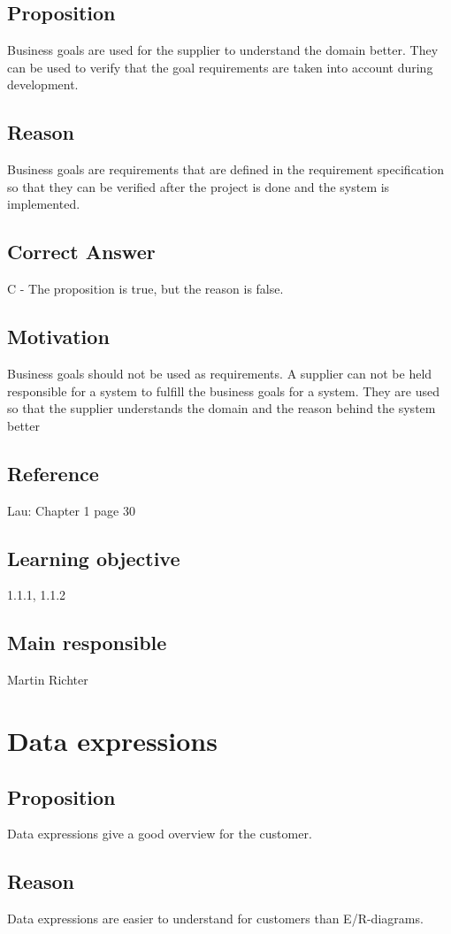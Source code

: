 \documentclass[a4paper]{article}
\begin{document}
\subsection*{Proposition}
Business goals are used for the supplier to understand the domain better. They can be used to verify that the goal requirements are taken into account during development.
\subsection*{Reason}
Business goals are requirements that are defined in the requirement specification so that they can be verified after the project is done and the system is implemented.
\subsection*{Correct Answer}
C - The proposition is true, but the reason is false.
\subsection*{Motivation}
Business goals should not be used as requirements. A supplier can not be held responsible for a system to fulfill the business goals for a system. They are used so that the supplier understands the domain and the reason behind the system better
\subsection*{Reference}
Lau: Chapter 1 page 30
\subsection*{Learning objective}
1.1.1, 1.1.2
\subsection*{Main responsible}
Martin Richter


\section{Data expressions}
\subsection*{Proposition}
Data expressions give a good overview for the customer.
\subsection*{Reason}
Data expressions are easier to understand for customers than E/R-diagrams. 
\end{document}
